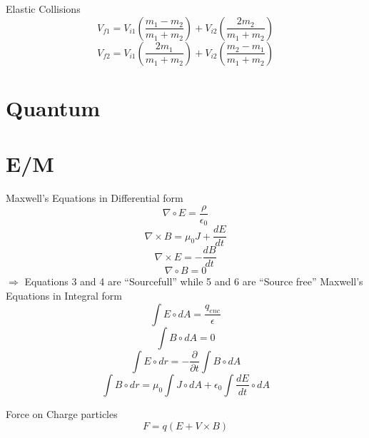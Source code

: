 \documentclass{article}
\begin{document}
Elastic Collisions\begin{equation}V_{f1}=V_{i1}(\frac{m_1-m_2}{m_1+m_2})+V_{i2}(\frac{2m_2}{m_1+m_2})\end{equation}
\begin{equation}V_{f2}=V_{i1}(\frac{2m_1}{m_1+m_2})+V_{i2}(\frac{m_2-m_1}{m_1+m_2})\end{equation}








\section{Quantum}









\section{E/M}
Maxwell's Equations in Differential form
\begin{equation}\nabla \circ E=\frac{\rho}{\epsilon_0}\end{equation}
\begin{equation}\nabla \times B=\mu_0 J + \frac{dE}{dt}\end{equation}
\begin{equation}\nabla \times E=-\frac{dB}{dt}\end{equation}
\begin{equation}\nabla \circ B=0\end{equation}
$\Rightarrow$ Equations 3 and 4 are ``Sourcefull'' while 5 and 6 are ``Source free''
Maxwell's Equations in Integral form
\begin{equation}\int E \circ dA=\frac{q_{enc}}{\epsilon}\end{equation}
\begin{equation}\int B \circ dA=0\end{equation}
\begin{equation}\int E \circ dr=-\frac{\partial}{\partial t}\int B \circ dA \end{equation}
\begin{equation}\int B \circ dr=\mu_0 \int J \circ dA + \epsilon_0 \int \frac{dE}{dt}\circ dA\end{equation}

Force on Charge particles\begin{equation}F=q(E+V\times B)\end{equation}
\end{document}
